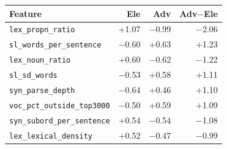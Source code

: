 \begin{tabular}{lrrr}
\toprule
Feature & Ele & Adv & Adv$-$Ele \\
\midrule
\texttt{lex\_propn\_ratio} & +1.07 & $-$0.99 & $-$2.06 \\
\texttt{sl\_words\_per\_sentence} & $-$0.60 & +0.63 & +1.23 \\
\texttt{lex\_noun\_ratio} & +0.60 & $-$0.62 & $-$1.22 \\
\texttt{sl\_sd\_words} & $-$0.53 & +0.58 & +1.11 \\
\texttt{syn\_parse\_depth} & $-$0.64 & +0.46 & +1.10 \\
\texttt{voc\_pct\_outside\_top3000} & $-$0.50 & +0.59 & +1.09 \\
\texttt{syn\_subord\_per\_sentence} & +0.54 & $-$0.54 & $-$1.08 \\
\texttt{lex\_lexical\_density} & +0.52 & $-$0.47 & $-$0.99 \\
\bottomrule
\end{tabular}
